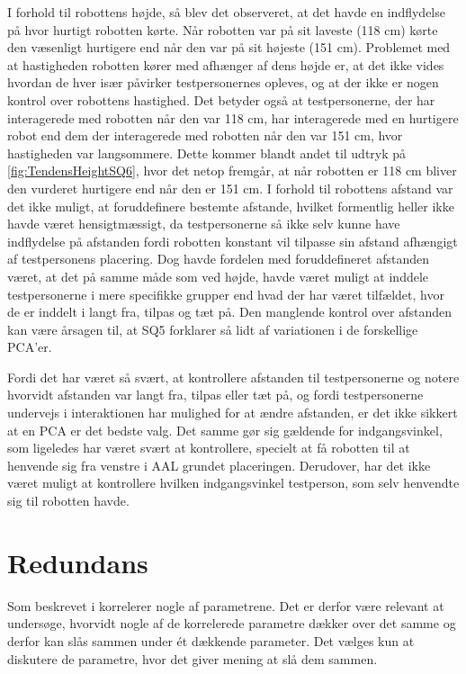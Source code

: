 I forhold til robottens højde, så blev det observeret, at det havde en indflydelse på hvor hurtigt robotten kørte. Når robotten var på sit laveste (118 cm) kørte den væsenligt hurtigere end når den var på sit højeste (151 cm). Problemet med at hastigheden robotten kører med afhænger af dens højde er, at det ikke vides hvordan de hver især påvirker testpersonernes opleves, og at der ikke er nogen kontrol over robottens hastighed. Det betyder også at testpersonerne, der har interagerede med robotten når den var 118 cm, har interagerede med en hurtigere robot end dem der interagerede med robotten når den var 151 cm, hvor hastigheden var langsommere. Dette kommer blandt andet til udtryk på \autoref{fig:TendensHeightSQ6}, hvor det netop fremgår, at når robotten er 118 cm bliver den vurderet hurtigere end når den er 151 cm. \blankline
%
I forhold til robottens afstand var det ikke muligt, at foruddefinere bestemte afstande, hvilket formentlig heller ikke havde været hensigtmæssigt, da testpersonerne så ikke selv kunne have indflydelse på afstanden fordi robotten konstant vil tilpasse sin afstand afhængigt af testpersonens placering. Dog havde fordelen med foruddefineret afstanden været, at det på samme måde som ved højde, havde været muligt at inddele testpersonerne i mere specifikke grupper end hvad der har været tilfældet, hvor de er inddelt i langt fra, tilpas og tæt på. Den manglende kontrol over afstanden kan være årsagen til, at SQ5 forklarer så lidt af variationen i de forskellige PCA'er.

Fordi det har været så svært, at kontrollere afstanden til testpersonerne og notere hvorvidt afstanden var langt fra, tilpas eller tæt på, og fordi testpersonerne undervejs i interaktionen har mulighed for at ændre afstanden, er det ikke sikkert at en PCA er det bedste valg. Det samme gør sig gældende for indgangsvinkel, som ligeledes har været svært at kontrollere, specielt at få robotten til at henvende sig fra venstre i AAL grundet placeringen. Derudover, har det ikke været muligt at kontrollere hvilken indgangsvinkel testperson, som selv henvendte sig til robotten havde. 


\section{Redundans}
\label{DiskussionRedundansSkalaer}
%
Som beskrevet i  korrelerer nogle af parametrene. Det er derfor være relevant at undersøge, hvorvidt nogle af de korrelerede parametre dækker over det samme og derfor kan slås sammen under ét dækkende parameter. Det vælges kun at diskutere de parametre, hvor det giver mening at slå dem sammen. 

